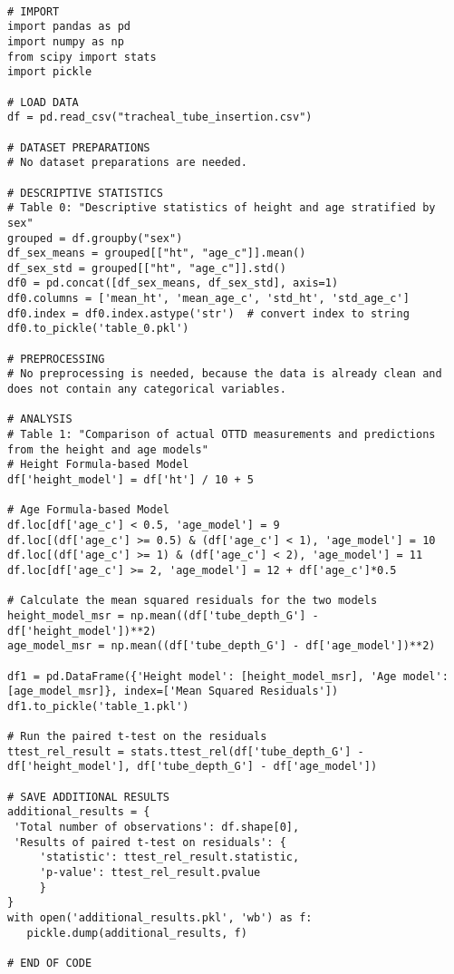 \documentclass[11pt]{article}
\begin{document}
\begin{verbatim}

# IMPORT
import pandas as pd
import numpy as np
from scipy import stats
import pickle

# LOAD DATA
df = pd.read_csv("tracheal_tube_insertion.csv")

# DATASET PREPARATIONS
# No dataset preparations are needed.

# DESCRIPTIVE STATISTICS
# Table 0: "Descriptive statistics of height and age stratified by sex"
grouped = df.groupby("sex")
df_sex_means = grouped[["ht", "age_c"]].mean()
df_sex_std = grouped[["ht", "age_c"]].std()
df0 = pd.concat([df_sex_means, df_sex_std], axis=1)
df0.columns = ['mean_ht', 'mean_age_c', 'std_ht', 'std_age_c'] 
df0.index = df0.index.astype('str')  # convert index to string
df0.to_pickle('table_0.pkl')

# PREPROCESSING 
# No preprocessing is needed, because the data is already clean and does not contain any categorical variables.

# ANALYSIS
# Table 1: "Comparison of actual OTTD measurements and predictions from the height and age models"
# Height Formula-based Model
df['height_model'] = df['ht'] / 10 + 5

# Age Formula-based Model
df.loc[df['age_c'] < 0.5, 'age_model'] = 9
df.loc[(df['age_c'] >= 0.5) & (df['age_c'] < 1), 'age_model'] = 10
df.loc[(df['age_c'] >= 1) & (df['age_c'] < 2), 'age_model'] = 11
df.loc[df['age_c'] >= 2, 'age_model'] = 12 + df['age_c']*0.5

# Calculate the mean squared residuals for the two models
height_model_msr = np.mean((df['tube_depth_G'] - df['height_model'])**2)
age_model_msr = np.mean((df['tube_depth_G'] - df['age_model'])**2)

df1 = pd.DataFrame({'Height model': [height_model_msr], 'Age model': [age_model_msr]}, index=['Mean Squared Residuals'])
df1.to_pickle('table_1.pkl')

# Run the paired t-test on the residuals
ttest_rel_result = stats.ttest_rel(df['tube_depth_G'] - df['height_model'], df['tube_depth_G'] - df['age_model'])

# SAVE ADDITIONAL RESULTS
additional_results = {
 'Total number of observations': df.shape[0],  
 'Results of paired t-test on residuals': {
     'statistic': ttest_rel_result.statistic,
     'p-value': ttest_rel_result.pvalue
     }
}
with open('additional_results.pkl', 'wb') as f:
   pickle.dump(additional_results, f)
   
# END OF CODE

\end{verbatim}
\end{document}

